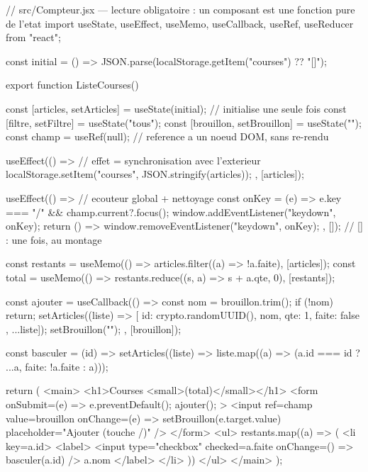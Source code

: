 \documentclass[12pt,a4paper,twoside,openright]{book}
\begin{document}
\begin{codejs}
// src/Compteur.jsx --- lecture obligatoire : un composant est une fonction pure de l'etat
import { useState, useEffect, useMemo, useCallback, useRef, useReducer } from "react";

const initial = () => JSON.parse(localStorage.getItem("courses") ?? "[]");

export function ListeCourses() {
  const [articles, setArticles] = useState(initial);          // initialise une seule fois
  const [filtre, setFiltre] = useState("tous");
  const [brouillon, setBrouillon] = useState("");
  const champ = useRef(null);                                  // reference a un noeud DOM, sans re-rendu

  useEffect(() => {                                            // effet = synchronisation avec l'exterieur
    localStorage.setItem("courses", JSON.stringify(articles));
  }, [articles]);

  useEffect(() => {                                            // ecouteur global + nettoyage
    const onKey = (e) => e.key === "/" && champ.current?.focus();
    window.addEventListener("keydown", onKey);
    return () => window.removeEventListener("keydown", onKey);
  }, []);                                                        // [] : une fois, au montage

  const restants = useMemo(() => articles.filter((a) => !a.faite), [articles]);
  const total = useMemo(() => restants.reduce((s, a) => s + a.qte, 0), [restants]);

  const ajouter = useCallback(() => {
    const nom = brouillon.trim();
    if (!nom) return;
    setArticles((liste) => [{ id: crypto.randomUUID(), nom, qte: 1, faite: false }, ...liste]);
    setBrouillon("");
  }, [brouillon]);

  const basculer = (id) =>
    setArticles((liste) => liste.map((a) => (a.id === id ? { ...a, faite: !a.faite } : a)));

  return (
    <main>
      <h1>Courses <small>({total})</small></h1>
      <form onSubmit={(e) => { e.preventDefault(); ajouter(); }}>
        <input ref={champ} value={brouillon} onChange={(e) => setBrouillon(e.target.value)}
               placeholder="Ajouter (touche /)" />
      </form>
      <ul>
        {restants.map((a) => (
          <li key={a.id}>
            <label>
              <input type="checkbox" checked={a.faite} onChange={() => basculer(a.id)} />
              {a.nom}
            </label>
          </li>
        ))}
      </ul>
    </main>
  );
}
\end{codejs}
\end{document}
